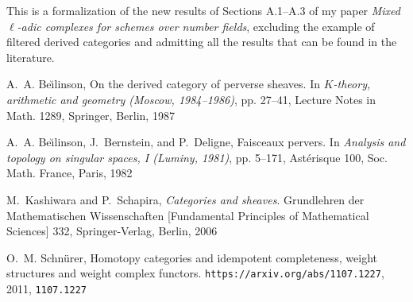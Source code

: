 %

This is a formalization of the new results of Sections A.1--A.3 of my paper 
\emph{Mixed $\ell$-adic complexes for schemes over number fields}, excluding
the example of filtered derived categories and admitting
all the results that can be found in the literature.

\tableofcontents





\def\cprime{$'$}
\begin{thebibliography}{10}
\providecommand{\url}[1]{\texttt{#1}}
\providecommand{\urlprefix}{URL }
\providecommand{\eprint}[2][]{\url{#2}}

A.~A. Be{\u\i}linson, On the derived category of perverse sheaves. In
  \emph{{$K$}-theory, arithmetic and geometry ({M}oscow, 1984--1986)}, pp.
  27--41, Lecture Notes in Math. 1289, Springer, Berlin, 1987 

A.~A. Be{\u\i}linson, J.~Bernstein, and P.~Deligne, Faisceaux pervers. In
  \emph{Analysis and topology on singular spaces, {I} ({L}uminy, 1981)}, pp.
  5--171, Ast\'erisque 100, Soc. Math. France, Paris, 1982

M.~Kashiwara and P.~Schapira, \emph{Categories and sheaves}. Grundlehren der
  Mathematischen Wissenschaften [Fundamental Principles of Mathematical
  Sciences] 332, Springer-Verlag, Berlin, 2006


O.~M. Schnürer, Homotopy categories and idempotent completeness, weight
  structures and weight complex functors.
  \url{https://arxiv.org/abs/1107.1227}, 2011, \eprint{1107.1227}

\end{thebibliography}